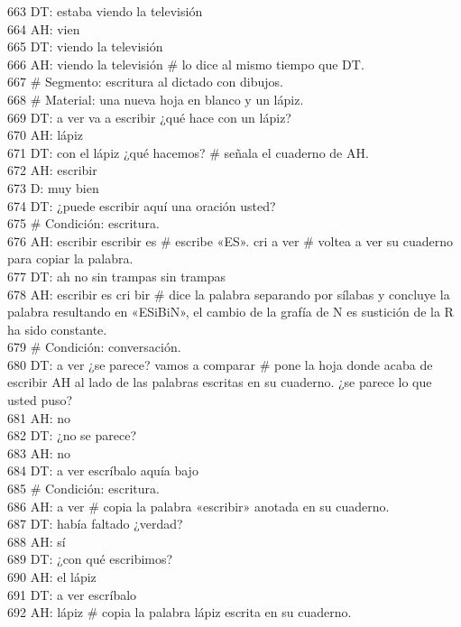 663 DT: estaba viendo la televisión\\
664 AH: vien\\
665 DT: viendo la televisión\\
666 AH: viendo la televisión \# lo dice al mismo tiempo que DT.\\
667 \# Segmento: escritura al dictado con dibujos.\\
668 \# Material: una nueva hoja en blanco y un lápiz.\\
669 DT: a ver va a escribir ¿qué hace con un lápiz?\\
670 AH: lápiz\\
671 DT: con el lápiz ¿qué hacemos? \# señala el cuaderno de AH.\\
672 AH: escribir\\
673 D: muy bien\\
674 DT: ¿puede escribir aquí una oración usted?\\
675 \# Condición: escritura.\\
676 AH: escribir escribir es \# escribe «ES». cri a ver \# voltea a ver su cuaderno para copiar la palabra. \\
677 DT: ah no sin trampas sin trampas\\
678 AH: escribir es cri bir \# dice la palabra separando por sílabas y concluye la palabra resultando en «ESiBiN», el cambio de la grafía de N es sustición de la R ha sido constante.\\
679 \# Condición: conversación.\\
680 DT: a ver ¿se parece? vamos a comparar \# pone la hoja donde acaba de escribir AH al lado de las palabras escritas en su cuaderno. ¿se parece lo que usted puso?\\
681 AH: no\\
682 DT: ¿no se parece?\\
683 AH: no\\
684 DT: a ver escríbalo aquía bajo\\
685 \# Condición: escritura.\\
686 AH: a ver \# copia la palabra «escribir» anotada en su cuaderno.\\
687 DT: había faltado ¿verdad?\\
688 AH: sí\\
689 DT: ¿con qué escribimos?\\
690 AH: el lápiz\\
691 DT: a ver escríbalo\\
692 AH: lápiz \# copia la palabra lápiz escrita en su cuaderno.\\
